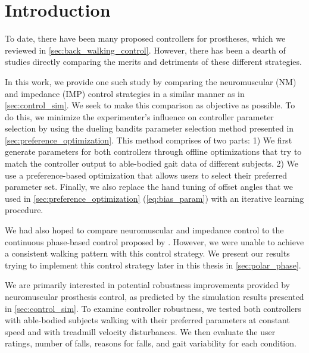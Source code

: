 \section{Introduction}

To date, there have been many proposed controllers for prostheses, which we
reviewed in \cref{sec:back_walking_control}. However, there has been a dearth of
studies directly comparing the merits and detriments of these different
strategies. 

In this work, we provide one such study by comparing the neuromuscular (NM) and
impedance (IMP) control strategies in a similar manner as in
\cref{sec:control_sim}.  We seek to make this comparison as objective as
possible. To do this, we minimize the experimenter's influence on controller
parameter selection by using the dueling bandits parameter selection method
presented in \cref{sec:preference_optimization}. This method comprises of two
parts: 1) We first generate parameters for both controllers through offline
optimizations that try to match the controller output to able-bodied gait data
of different subjects. 2) We use a preference-based optimization that allows
users to select their preferred parameter set. Finally, we also replace the hand
tuning of offset angles that we used in \cref{sec:preference_optimization}
(\cref{eq:bias_param}) with an iterative learning procedure.

We had also hoped to compare neuromuscular and impedance control to the
continuous phase-based control proposed by \citet{quintero2016preliminary}.
However, we were unable to achieve a consistent walking pattern with this
control strategy. We present our results trying to implement this control
strategy later in this thesis in \cref{sec:polar_phase}.

We are primarily interested in potential robustness improvements provided by
neuromuscular prosthesis control, as predicted by the simulation results
presented in \cref{sec:control_sim}. To examine controller robustness, we tested
both controllers with able-bodied subjects walking with their preferred
parameters at constant speed and with treadmill velocity disturbances. We then
evaluate the user ratings, number of falls, reasons for falls, and gait
variability for each condition. 
